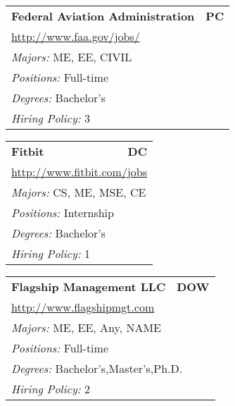 \documentclass[twoside]{article}
\begin{document}
\begin{center}
\begin{multicols}{3}
\begin{FlushLeft}
\begin{minipage}{.9\columnwidth}
\end{minipage}
 
\begin{minipage}{.9\columnwidth}\begin{tabularx}{.95\columnwidth}{Xr}
                 {\Large\bf Federal Aviation Administration} & {\Large\bf PC}\\
    \multicolumn{2}{p{.95\columnwidth}}{\url{http://www.faa.gov/jobs/}}\\
    \multicolumn{2}{p{.95\columnwidth}}{\emph{Majors:} ME, EE, CIVIL}\\
    \multicolumn{2}{p{.95\columnwidth}}{\emph{Positions:} Full-time}\\
    \multicolumn{2}{p{.95\columnwidth}}{\emph{Degrees:} Bachelor's}\\
    \multicolumn{2}{p{.95\columnwidth}}{\emph{Hiring Policy:} 3}\\
    \end{tabularx}
    
\end{minipage}
 
\begin{minipage}{.9\columnwidth}\begin{tabularx}{.95\columnwidth}{Xr}
                 {\Large\bf Fitbit} & {\Large\bf DC}\\
    \multicolumn{2}{p{.95\columnwidth}}{\url{http://www.fitbit.com/jobs}}\\
    \multicolumn{2}{p{.95\columnwidth}}{\emph{Majors:} CS, ME, MSE, CE}\\
    \multicolumn{2}{p{.95\columnwidth}}{\emph{Positions:} Internship}\\
    \multicolumn{2}{p{.95\columnwidth}}{\emph{Degrees:} Bachelor's}\\
    \multicolumn{2}{p{.95\columnwidth}}{\emph{Hiring Policy:} 1}\\
    \end{tabularx}
    
\end{minipage}
 
\begin{minipage}{.9\columnwidth}\begin{tabularx}{.95\columnwidth}{Xr}
                 {\Large\bf Flagship Management LLC} & {\Large\bf DOW}\\
    \multicolumn{2}{p{.95\columnwidth}}{\url{http://www.flagshipmgt.com}}\\
    \multicolumn{2}{p{.95\columnwidth}}{\emph{Majors:} ME, EE, Any, NAME}\\
    \multicolumn{2}{p{.95\columnwidth}}{\emph{Positions:} Full-time}\\
    \multicolumn{2}{p{.95\columnwidth}}{\emph{Degrees:} Bachelor's,Master's,Ph.D.}\\
    \multicolumn{2}{p{.95\columnwidth}}{\emph{Hiring Policy:} 2}\\
    \end{tabularx}
    

\end{minipage}
\end{FlushLeft}
\end{multicols}
\end{center}
\end{document}
